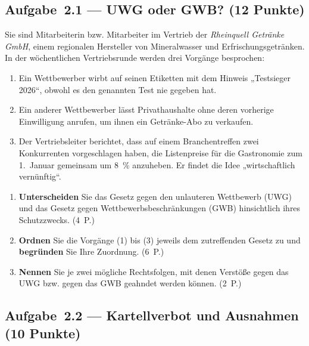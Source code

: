 
\subsection*{Aufgabe~2.1 --- UWG oder GWB? (12 Punkte)}

Sie sind Mitarbeiterin bzw. Mitarbeiter im Vertrieb der \emph{Rheinquell Getränke GmbH},
einem regionalen Hersteller von Mineralwasser und Erfrischungsgetränken. In der
wöchentlichen Vertriebsrunde werden drei Vorgänge besprochen:

\begin{enumerate}[label=(\arabic*)]
  \item Ein Wettbewerber wirbt auf seinen Etiketten mit dem Hinweis „Testsieger 2026``,
    obwohl es den genannten Test nie gegeben hat.
  \item Ein anderer Wettbewerber lässt Privathaushalte ohne deren vorherige Einwilligung
    anrufen, um ihnen ein Getränke-Abo zu verkaufen.
  \item Der Vertriebsleiter berichtet, dass auf einem Branchentreffen zwei Konkurrenten
    vorgeschlagen haben, die Listenpreise für die Gastronomie zum 1.~Januar gemeinsam
    um 8~\% anzuheben. Er findet die Idee „wirtschaftlich vernünftig``.
\end{enumerate}

\begin{enumerate}[label=\alph*)]
  \item \textbf{Unterscheiden} Sie das Gesetz gegen den unlauteren Wettbewerb (UWG) und
    das Gesetz gegen Wettbewerbsbeschränkungen (GWB) hinsichtlich ihres Schutzzwecks.
    \hfill (4~P.)
  \item \textbf{Ordnen} Sie die Vorgänge (1) bis (3) jeweils dem zutreffenden Gesetz zu und
    \textbf{begründen} Sie Ihre Zuordnung. \hfill (6~P.)
  \item \textbf{Nennen} Sie je zwei mögliche Rechtsfolgen, mit denen Verstöße gegen das UWG
    bzw. gegen das GWB geahndet werden können. \hfill (2~P.)
\end{enumerate}

\subsection*{Aufgabe~2.2 --- Kartellverbot und Ausnahmen (10 Punkte)}

